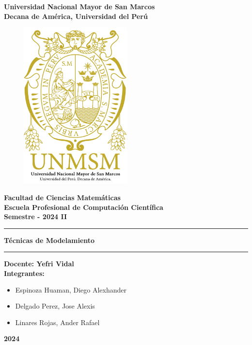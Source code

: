 \begin{titlepage}
  \rmfamily
  \begin{center}
  \LARGE\textbf{Universidad Nacional Mayor de San Marcos}\\
  \vspace{2.5mm}
  \large\textbf{Decana de América, Universidad del Perú}\\
  \vspace{2.5mm}
  \begin{figure}[H]
    \centering
    \includegraphics[height=8.5cm]{src/include/logo.png}
  \end{figure}
  \Large\textbf{Facultad de Ciencias Matemáticas}\\
  \vspace{2.5mm}
  \large\textbf{Escuela Profesional de Computación Científica}\\
  \vspace{2.5mm}
  \large\textbf{Semestre - 2024 II}\\
  \rule{\linewidth}{0.55mm}
  \Large\textbf{Técnicas de Modelamiento}\\
  \rule{\linewidth}{0.55mm}
  \large\textbf{Docente: Yefri Vidal}\\
  \vspace{2.5mm}
  \large\textbf{Integrantes:}\\
  \vspace{2.5mm}
  \begin{itemize}
    \normalsize
    \item Espinoza Huaman, Diego Alexhander
    \item Delgado Perez, Jose Alexis
    \item Linares Rojas, Ander Rafael
  \end{itemize}
  \vfill
  {\huge\textbf{2024}}
  \end{center}
\end{titlepage}
